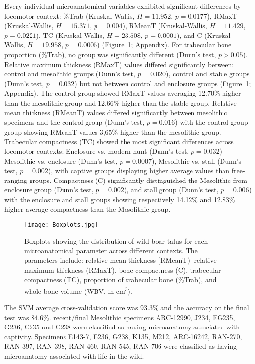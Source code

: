 \documentclass[12pt,a4paper]{article}
\begin{document}
Every individual microanatomical variables exhibited significant differences by locomotor context: \%Trab (Kruskal-Wallis, $H = 11.952$, $p = 0.0177$), RMaxT (Kruskal-Wallis, $H = 15.371$, $p = 0.004$), RMeanT (Kruskal-Wallis, $H = 11.429$, $p =0.0221$), TC (Kruskal-Wallis, $H = 23.508$, $p = 0.0001$), and C (Kruskal-Wallis, $H = 19.958$, $p = 0.0005$) (Figure~\ref{Boxplots}; Appendix). For trabecular bone proportion (\%Trab), no group was significantly different (Dunn's test, $p > 0.05$). Relative maximum thickness (RMaxT) values differed significantly between: control and mesolithic groups (Dunn's test, $p = 0.020$), control and stable groups (Dunn's test, $p = 0.032$) but not between control and enclosure groups (Figure~\ref{Boxplots}; Appendix). The control group showed RMaxT values averaging 12.70\% higher than the mesolithic group and 12,66\% higher than the stable group.
Relative mean thickness (RMeanT) values differed significantly between mesolithic specimens and the	control	group (Dunn's test, $p = 0.016$) with the control group group showing RMeanT values 3,65\% higher than the mesolithic group.
Trabecular compactness (TC) showed the most significant differences across locomotor contexts: Enclosure vs. modern hunt (Dunn's test, $p = 0.032 $), Mesolithic vs. enclosure (Dunn's test, $p = 0.0007$), Mesolithic vs. stall (Dunn's test, $p = 0.002$), with captive groups displaying higher average values than free-ranging groups.  
Compactness (C) significantly distinguished the Mesolithic from enclosure group (Dunn's test, $p = 0.002 $), and stall group (Dunn's test, $p = 0.006 $) with the enclosure and stall groups showing respectively 14.12\% and 12.83\% higher average compactness than the Mesolithic group. %

\begin{figure}[H]
	\texttt{[image: Boxplots.jpg]}
	\caption{Boxplots showing the distribution of wild boar talus for each microanatomical parameter across different contexts. The parameters include: relative mean thickness (RMeanT), relative maximum thickness (RMaxT), bone compactness (C), trabecular compactness (TC), proportion of trabecular bone (\%Trab), and whole bone volume (WBV, in cm\textsuperscript{3}).}
	\label{Boxplots}
\end{figure}

The SVM average cross-validation score was 93.3\% and the accuracy on the final test was 84.6\%. recent/final Mesolithic specimens ARC-12990, J234, EG235, G236, C235 and C238 were classified as having microanatomy associated with captivity. Specimens E143-7, E236, G238, K135, M212, ARC-16242, RAN-270, RAN-397, RAN-398, RAN-460, RAN-545, RAN-706 were classified as having microanatomy associated with life in the wild.
\end{document}
